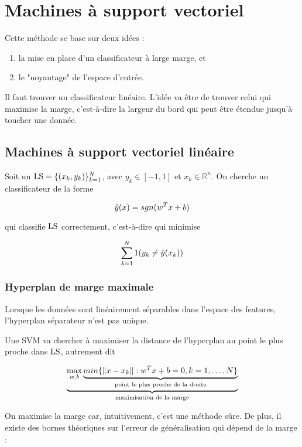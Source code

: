 \chapter{Machines à support vectoriel}

Cette méthode se base sur deux idées :

\begin{enumerate}
	\item la mise en place d'un classificateur à large marge, et
	\item le "noyautage" de l'espace d'entrée.
\end{enumerate}

Il faut trouver un classificateur linéaire. L'idée va être de trouver celui qui maximise la marge, c'est-à-dire la largeur du bord qui peut être étendue jusqu'à toucher une donnée.


\section{Machines à support vectoriel linéaire}
	
	Soit un $\text{LS} = \lbrace (x_k, y_k) \rbrace^N_{k = 1}$, avec $y_k \in [-1, 1]$ et $x_k \in \mathbb{R}^n$. On cherche un classificateur de la forme
	
	$$\hat{y}(x) = sgn(w^T x + b)$$
	
	qui classifie $\text{LS}$ correctement, c'est-à-dire qui minimise
	
	$$\sum_{k = 1}^N1(y_k \neq \hat{y}(x_k))$$
	
	\subsection{Hyperplan de marge maximale}
	
	Lorsque les données sont linéairement séparables dans l'espace des features, l'hyperplan séparateur n'est pas unique.
	
	
	Une SVM va chercher à maximiser la distance de l'hyperplan au point le plus proche dans $\text{LS}$, autrement dit
	
	$$\underbrace{\max_{w, b} \underbrace{min \lbrace \Vert x - x_k \Vert : w^T x + b = 0, k = 1, \dots , N \rbrace}_{\text{point le plus proche de la droite}}}_{\text{maximisation de la marge}}$$
	
	On maximise la marge car, intuitivement, c'est une méthode sûre. De plus, il existe des bornes théoriques sur l'erreur de généralisation qui dépend de la marge :
	
